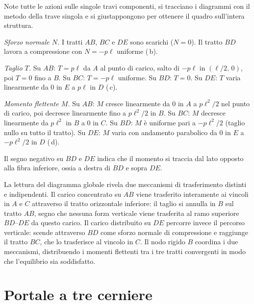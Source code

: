 Note tutte le azioni sulle singole travi
componenti, si tracciano i diagrammi con
il metodo della trave singola e si giustappongono
per ottenere il quadro sull'intera struttura.

\medskip
\noindent\textit{Sforzo normale $N$.}
I tratti $AB$, $BC$ e $DE$ sono scarichi
($N = 0$). Il tratto $BD$ lavora a compressione
con $N = -p\ell$ uniforme (\,b).

\medskip
\noindent\textit{Taglio $T$.}
Su $AB$: $T = p\ell$ da $A$ al punto di carico,
salto di $-p\ell$ in $(\ell/2,\,0)$, poi $T = 0$
fino a $B$.
Su $BC$: $T = -p\ell$ uniforme.
Su $BD$: $T = 0$.
Su $DE$: $T$ varia linearmente da $0$ in $E$
a $p\ell$ in $D$ (\,c).

\medskip
\noindent\textit{Momento flettente $M$.}
Su $AB$: $M$ cresce linearmente da $0$ in $A$
a $p\ell^2/2$ nel punto di carico, poi decresce
linearmente fino a $p\ell^2/2$ in $B$.
Su $BC$: $M$ decresce linearmente da $p\ell^2$
in $B$ a $0$ in $C$.
Su $BD$: $M$ è uniforme pari a $-p\ell^2/2$
(taglio nullo su tutto il tratto).
Su $DE$: $M$ varia con andamento parabolico
da $0$ in $E$ a $-p\ell^2/2$ in $D$ (\,d).

Il segno negativo su $BD$ e $DE$ indica che
il momento si traccia dal lato opposto alla
fibra inferiore, ossia a destra di $BD$ e
sopra $DE$.


\begin{oss}
	La lettura del diagramma globale rivela
	due meccanismi di trasferimento distinti
	e indipendenti. Il carico concentrato su
	$AB$ viene trasferito interamente ai vincoli
	in $A$ e $C$ attraverso il tratto orizzontale
	inferiore: il taglio si annulla in $B$ sul
	tratto $AB$, segno che nessuna forza verticale
	viene trasferita al ramo superiore $BD$--$DE$
	da questo carico. Il carico distribuito su
	$DE$ percorre invece il percorso verticale:
	scende attraverso $BD$ come sforzo normale
	di compressione e raggiunge il tratto $BC$,
	che lo trasferisce al vincolo in $C$. Il
	nodo rigido $B$ coordina i due meccanismi,
	distribuendo i momenti flettenti tra i tre
	tratti convergenti in modo che l'equilibrio
	sia soddisfatto.
\end{oss}


\section{Portale a tre cerniere}
\label{sec:arco_tre_cerniere}

